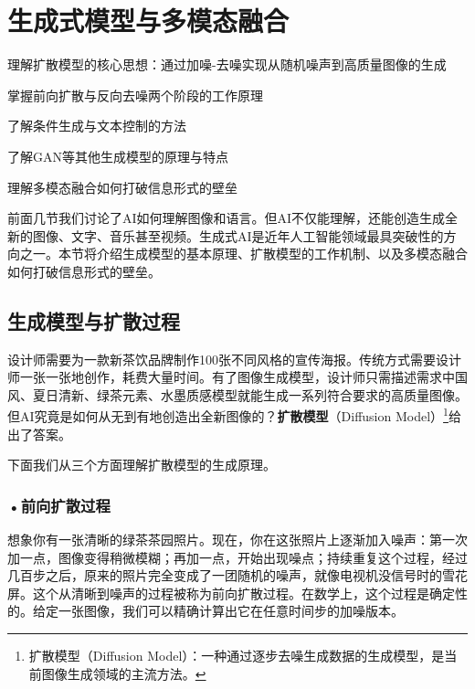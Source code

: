 \newpage

\section{生成式模型与多模态融合}


\begin{sectionkeypoints}
\item 理解扩散模型的核心思想：通过加噪-去噪实现从随机噪声到高质量图像的生成
\item 掌握前向扩散与反向去噪两个阶段的工作原理
\item 了解条件生成与文本控制的方法
\item 了解GAN等其他生成模型的原理与特点
\item 理解多模态融合如何打破信息形式的壁垒
\end{sectionkeypoints}


前面几节我们讨论了AI如何理解图像和语言。但AI不仅能理解，还能创造生成全新的图像、文字、音乐甚至视频。生成式AI是近年人工智能领域最具突破性的方向之一。本节将介绍生成模型的基本原理、扩散模型的工作机制、以及多模态融合如何打破信息形式的壁垒。



\subsection{生成模型与扩散过程}
设计师需要为一款新茶饮品牌制作100张不同风格的宣传海报。传统方式需要设计师一张一张地创作，耗费大量时间。有了图像生成模型，设计师只需描述需求中国风、夏日清新、绿茶元素、水墨质感模型就能生成一系列符合要求的高质量图像。但AI究竟是如何从无到有地创造出全新图像的？\textbf{扩散模型}（Diffusion Model）\footnote{扩散模型（Diffusion Model）：一种通过逐步去噪生成数据的生成模型，是当前图像生成领域的主流方法。}给出了答案。

下面我们从三个方面理解扩散模型的生成原理。

\subsubsection*{\textbf{•前向扩散过程}}

想象你有一张清晰的绿茶茶园照片。现在，你在这张照片上逐渐加入噪声：第一次加一点，图像变得稍微模糊；再加一点，开始出现噪点；持续重复这个过程，经过几百步之后，原来的照片完全变成了一团随机的噪声，就像电视机没信号时的雪花屏。这个从清晰到噪声的过程被称为前向扩散过程。在数学上，这个过程是确定性的。给定一张图像，我们可以精确计算出它在任意时间步的加噪版本。

